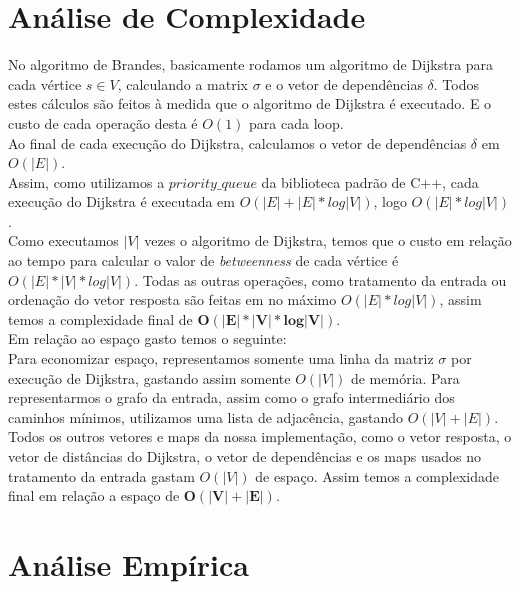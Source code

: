 \documentclass[10pt]{article}
\begin{document}
\section{Análise de Complexidade}
No algoritmo de Brandes, basicamente rodamos um algoritmo de Dijkstra para cada vértice $s \in V$, calculando a matrix $\sigma$ e o vetor de dependências $\delta$. Todos estes cálculos são feitos à medida que o algoritmo de Dijkstra é executado. E o custo de cada operação desta é $O(1)$ para cada loop.\\
Ao final de cada execução do Dijkstra, calculamos o vetor de dependências $\delta$ em $O(|E|)$.\\
Assim, como utilizamos a $priority\_queue$ da biblioteca padrão de C++, cada execução do Dijkstra é executada em $O(|E| + |E| * log |V|)$, logo $O(|E| * log |V|)$.\\
Como executamos $|V|$ vezes o algoritmo de Dijkstra, temos que o custo em relação ao tempo para calcular o valor de \textit{betweenness} de cada vértice é $O(|E| * |V| * log |V|)$. Todas as outras operações, como tratamento da entrada ou ordenação do vetor resposta são feitas em no máximo $O(|E| * log |V|)$, assim temos a complexidade final de $\bm{O(|E| * |V| * log |V|)}$.\\

Em relação ao espaço gasto temos o seguinte:\\
Para economizar espaço, representamos somente uma linha da matriz $\sigma$ por execução de Dijkstra, gastando assim somente $O(|V|)$ de memória. Para representarmos o grafo da entrada, assim como o grafo intermediário dos caminhos mínimos, utilizamos uma lista de adjacência, gastando $O(|V| + |E|)$. Todos os outros vetores e maps da nossa implementação, como o vetor resposta, o vetor de distâncias do Dijkstra, o vetor de dependências e os maps usados no tratamento da entrada gastam $O(|V|)$ de espaço. Assim temos a complexidade final em relação a espaço de $\bm{O(|V| + |E|)}$.


\section{Análise Empírica}
\end{document}
